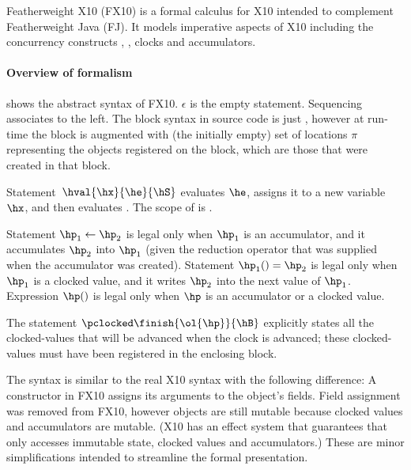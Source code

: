 Featherweight X10 (FX10) is a formal calculus for X10 intended to  complement Featherweight Java
(FJ).  It models imperative aspects of X10 including the concurrency
constructs \hfinish{}, \hasync{}, clocks and accumulators.


\paragraph{Overview of formalism}


 shows the abstract syntax of FX10.
$\epsilon$ is the empty statement. Sequencing associates to the left.
The block syntax in source code is just \code{\{\hS\}},
however at run-time the block is augmented with (the initially empty) set of locations
$\pi$ representing the objects registered on the block,
     which are those that were created in that block.

Statement~$\hval{\hx}{\he}{\hS}$ evaluates $\he$, assigns it to a
new variable $\hx$, and then evaluates \hS. The scope of \hx{} is \hS.

Statement $\hp_1 \leftarrow \hp_2$ is legal only when $\hp_1$ is an accumulator,
    and it accumulates $\hp_2$ into $\hp_1$ (given the reduction operator that was supplied when the accumulator was created).
Statement $\hp_1() = \hp_2$ is legal only when $\hp_1$ is a clocked value,
    and it writes $\hp_2$ into the next value of $\hp_1$.
Expression $\hp()$ is legal only when $\hp$ is an accumulator or a clocked value.

The \hfinish statement $\pclocked \finish{\ol{\hp}}{\hB}$ explicitly states all the clocked-values
    that will be advanced when the clock is advanced;
    these clocked-values must have been registered in the enclosing block.

The syntax is similar to the real X10 syntax with the following difference:
A constructor in FX10 assigns its arguments to the object's fields.
Field assignment was removed from FX10, however objects are still mutable because clocked values and accumulators
    are mutable.
(X10 has an effect system that guarantees that \hasync{} only accesses immutable state, clocked values and accumulators.)
These are minor simplifications intended to
    streamline the formal presentation.

